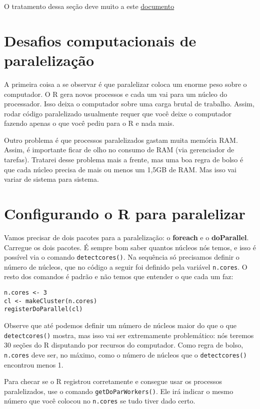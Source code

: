 \documentclass[]{book}
\begin{document}
O tratamento dessa seção deve muito a este
\href{http://michaeljkoontz.weebly.com/uploads/1/9/9/4/19940979/parallel.pdf}{documento}

\section{Desafios computacionais de
paralelização}\label{desafios-computacionais-de-paralelizacao}

A primeira coisa a se observar é que paralelizar coloca um enorme peso
sobre o computador. O R gera novos processos e cada um vai para um
núcleo do processador. Isso deixa o computador sobre uma carga brutal de
trabalho. Assim, rodar código paralelizado usualmente requer que você
deixe o computador fazendo apenas o que você pediu para o R e nada mais.

Outro problema é que processos paralelizados gastam muita memória RAM.
Assim, é importante ficar de olho no consumo de RAM (via gerenciador de
tarefas). Tratarei desse problema mais a frente, mas uma boa regra de
bolso é que cada núcleo precisa de mais ou menos um 1,5GB de RAM. Mas
isso vai variar de sistema para sistema.

\section{Configurando o R para
paralelizar}\label{configurando-o-r-para-paralelizar}

Vamos precisar de dois pacotes para a paralelização: o \textbf{foreach}
e o \textbf{doParallel}. Carregue os dois pacotes. É sempre bom saber
quantos núcleos nós temos, e isso é possível via o comando
\texttt{detectcores()}. Na sequência só precisamos definir o número de
núcleos, que no código a seguir foi definido pela variável
\texttt{n.cores}. O resto dos comandos é padrão e não temos que entender
o que cada um faz:

\begin{verbatim}
n.cores <- 3
cl <- makeCluster(n.cores)
registerDoParallel(cl)
\end{verbatim}

Observe que até podemos definir um número de núcleos maior do que o que
\texttt{detectcores()} mostra, mas isso vai ser extremamente
problemático: nós teremos 30 seções do R disputando por recursos do
computador. Como regra de bolso, \texttt{n.cores} deve ser, no máximo,
como o número de núcleos que o \texttt{detectcores()} encontrou menos 1.

Para checar se o R registrou corretamente e consegue usar os processos
paralelizados, use o comando \texttt{getDoParWorkers()}. Ele irá indicar
o mesmo número que você colocou no \texttt{n.cores} se tudo tiver dado
certo.
\end{document}
